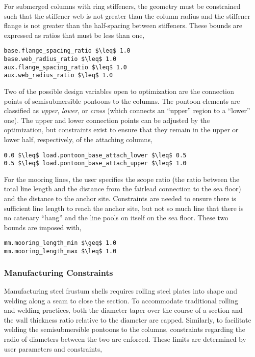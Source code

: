 For submerged columns with ring stiffeners, the geometry must be
constrained such that the stiffener web is not greater than the column
radius and the stiffener flange is not greater than the half-spacing
between stiffeners.  These bounds are expressed as ratios that must be
less than one,
\begin{lstlisting}
base.flange_spacing_ratio $\leq$ 1.0
base.web_radius_ratio $\leq$ 1.0
aux.flange_spacing_ratio $\leq$ 1.0
aux.web_radius_ratio $\leq$ 1.0
\end{lstlisting}

Two of the possible design variables open to optimization are the
connection points of semisubmersible pontoons to the columns.  The
pontoon elements are classified as \textit{upper}, \textit{lower}, or
\textit{cross} (which connects an ``upper'' region to a ``lower'' one).
The upper and lower connection points can be adjusted by the
optimization, but constraints exist to ensure that they remain in the
upper or lower half, respectively, of the attaching columns,
\begin{lstlisting}
0.0 $\leq$ load.pontoon_base_attach_lower $\leq$ 0.5
0.5 $\leq$ load.pontoon_base_attach_upper $\leq$ 1.0
\end{lstlisting}

For the mooring lines, the user specifies the scope ratio (the ratio
between the total line length and the distance from the fairlead
connection to the sea floor) and the distance to the anchor site.
Constraints are needed to ensure there is sufficient line length to
reach the anchor site, but not so much line that there is no catenary
``hang'' and the line pools on itself on the sea floor.  These two
bounds are imposed with,
\begin{lstlisting}
mm.mooring_length_min $\geq$ 1.0
mm.mooring_length_max $\leq$ 1.0
\end{lstlisting}


\subsubsection{Manufacturing Constraints}
Manufacturing steel frustum shells requires rolling steel plates into
shape and welding along a seam to close the section.  To accommodate
traditional rolling and welding practices, both the diameter taper over
the course of a section and the wall thickness ratio relative to the
diameter are capped.  Similarly, to facilitate welding the
semisubmersible pontoons to the columns, constraints regarding the radio
of diameters between the two are enforced. These limits are determined
by user parameters and constraints,

